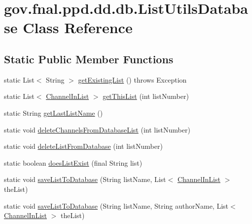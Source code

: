 \hypertarget{classgov_1_1fnal_1_1ppd_1_1dd_1_1db_1_1ListUtilsDatabase}{\section{gov.\-fnal.\-ppd.\-dd.\-db.\-List\-Utils\-Database Class Reference}
\label{classgov_1_1fnal_1_1ppd_1_1dd_1_1db_1_1ListUtilsDatabase}
}
\subsection*{Static Public Member Functions}
\begin{DoxyCompactItemize}
\item 
static List$<$ String $>$ \hyperlink{classgov_1_1fnal_1_1ppd_1_1dd_1_1db_1_1ListUtilsDatabase_afb004a01d8a3d02efaaa50ed734b0564}{get\-Existing\-List} ()  throws Exception 
\item 
static List$<$ \hyperlink{interfacegov_1_1fnal_1_1ppd_1_1dd_1_1channel_1_1ChannelInList}{Channel\-In\-List} $>$ \hyperlink{classgov_1_1fnal_1_1ppd_1_1dd_1_1db_1_1ListUtilsDatabase_aee47d0141e92fe89e80a36b5a6a5cd04}{get\-This\-List} (int list\-Number)
\item 
static String \hyperlink{classgov_1_1fnal_1_1ppd_1_1dd_1_1db_1_1ListUtilsDatabase_a328b15f961d8325f5564b91d2bba7ead}{get\-Last\-List\-Name} ()
\item 
static void \hyperlink{classgov_1_1fnal_1_1ppd_1_1dd_1_1db_1_1ListUtilsDatabase_abaed6c93ac5b31e28158b84ec1d80986}{delete\-Channels\-From\-Database\-List} (int list\-Number)
\item 
static void \hyperlink{classgov_1_1fnal_1_1ppd_1_1dd_1_1db_1_1ListUtilsDatabase_a514d14190bbbb559a123956f472db983}{delete\-List\-From\-Database} (int list\-Number)
\item 
static boolean \hyperlink{classgov_1_1fnal_1_1ppd_1_1dd_1_1db_1_1ListUtilsDatabase_a6a89a828ee53dccda4455a61cf7ac94c}{does\-List\-Exist} (final String list)
\item 
static void \hyperlink{classgov_1_1fnal_1_1ppd_1_1dd_1_1db_1_1ListUtilsDatabase_a118a13c8c7f09f5625b7734089572b3f}{save\-List\-To\-Database} (String list\-Name, List$<$ \hyperlink{interfacegov_1_1fnal_1_1ppd_1_1dd_1_1channel_1_1ChannelInList}{Channel\-In\-List} $>$ the\-List)
\item 
static void \hyperlink{classgov_1_1fnal_1_1ppd_1_1dd_1_1db_1_1ListUtilsDatabase_a50bec4bb6b4a903951b19495c8390831}{save\-List\-To\-Database} (String list\-Name, String author\-Name, List$<$ \hyperlink{interfacegov_1_1fnal_1_1ppd_1_1dd_1_1channel_1_1ChannelInList}{Channel\-In\-List} $>$ the\-List)

\end{DoxyCompactItemize}
